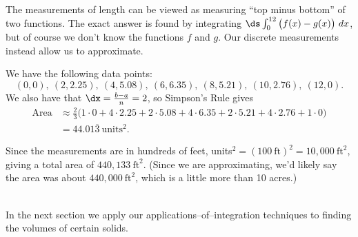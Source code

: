 {The measurements of length can be viewed as measuring ``top minus bottom'' of two functions. The exact answer is found by integrating $\ds \int_0^{12} \big(f(x)-g(x)\big)\ dx$, but of course we don't know the functions $f$ and $g$. Our discrete measurements instead allow us to approximate.

We have the following data points:
$$(0,0),\ (2,2.25),\ (4,5.08),\ (6,6.35),\ (8,5.21),\ (10,2.76),\ (12,0).$$
We also have that $\dx=\frac{b-a}{n} = 2$, so Simpson's Rule gives
\begin{align*}
\text{Area}&\approx \frac{2}{3}\Big(1\cdot0+4\cdot2.25+2\cdot5.08+4\cdot6.35+2\cdot5.21+4\cdot2.76+1\cdot0\Big)\\
			&= 44.01\overline{3} \ \text{units}^2.
\end{align*}

Since the measurements are in hundreds of feet, units${}^2 = (100\ \text{ft})^2 = 10,000\ \text{ft}^2$, giving a total area of $440,133\ \text{ft}^2$. (Since we are approximating, we'd likely say the area was about $440,000\ \text{ft}^2$, which is a little more than 10 acres.)
}
\\

In the next section we apply our applications--of--integration techniques to finding the volumes of certain solids.
